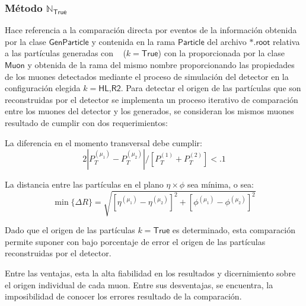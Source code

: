 \subsubsection{Método $\mathbb{N}_\textsf{True}$}
Hace referencia a la comparación directa por eventos de la información obtenida por la clase $\textsf{GenParticle}$  y contenida en la rama $\textsf{Particle}$ del archivo $\textsf{*.root}$ relativa a las partículas generadas con \MC ~ ($k=\textsf{True}$) con la proporcionada por la clase $\textsf{Muon}$ y obtenida de la rama del mismo nombre proporcionando las propiedades de los muones detectados mediante el proceso de simulación del detector en la configuración elegida $k=\textsf{HL,R2}$. %
Para detectar el origen de las partículas que son reconstruidas por el detector se implementa un proceso iterativo de comparación entre los muones del detector y los generados, se consideran los mismos muones resultado de cumplir con dos requerimientos: 
\begin{itemize_f}
\item La diferencia en el momento transversal debe cumplir:
\begin{equation}
2\left|P_T^{(\mu_1)}-P_T^{(\mu_2)}\right|/\left[P_T^{(1)}+P_T^{(2)}\right] < .1
\end{equation} 
\item La distancia entre las partículas en el plano $\eta \times \phi$ sea mínima, o sea:
\begin{equation}
\min{\{\Delta R\}} = \sqrt{\left[\eta^{(\mu_1)} - \eta^{(\mu_2)}\right]^2 + \left[\phi^{(\mu_1)} - \phi^{(\mu_2)}\right]^2}
\end{equation}
\end{itemize_f} 
Dado que el origen de las partículas $k=\textsf{True}$ es determinado, esta comparación permite suponer con bajo porcentaje de error el origen de las partículas reconstruidas por el detector.

Entre las ventajas, esta la alta fiabilidad en los resultados y dicernimiento sobre el origen individual de cada muon. Entre sus desventajas, se encuentra, la imposibilidad de conocer los errores resultado de la comparación. %

